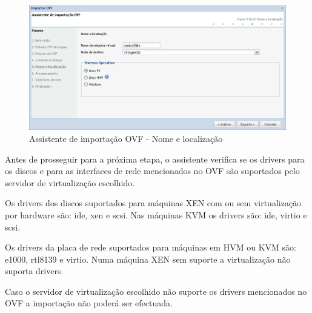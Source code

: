 \begin{description}
        \begin{figure}[H]
            \begin{center}
            \includegraphics[scale=0.5]{screenshots/ovf_import_name.png}
            \caption{Assistente de importação OVF - Nome e localização}
            \label{fig:ovf_import_name}
            \end{center}
        \end{figure}

        Antes de prosseguir para a próxima etapa, o assistente verifica se os drivers para os discos e para as interfaces de rede mencionados no OVF são suportados pelo servidor de virtualização escolhido.

        Os drivers dos discos suportados para máquinas XEN com ou sem virtualização por hardware são: ide, xen e scsi. Nas máquinas KVM os drivers são: ide, virtio e scsi.

        Os drivers da placa de rede suportados para máquinas em HVM ou KVM são: e1000, rtl8139 e virtio. Numa máquina XEN sem suporte a virtualização não suporta drivers.

        Caso o servidor de virtualização escolhido não suporte os drivers mencionados no OVF a importação não poderá ser efectuada.



\end{description}
